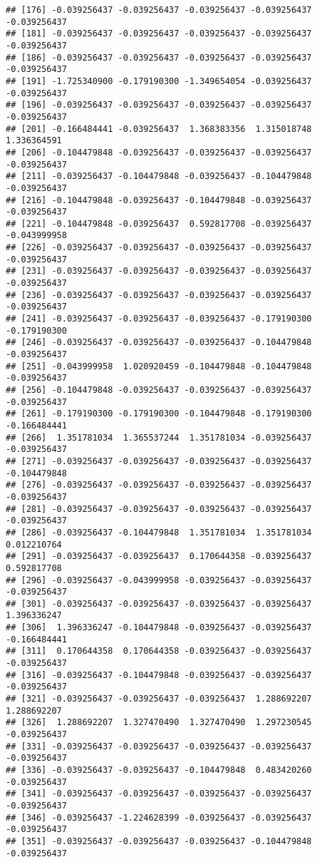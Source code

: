 \documentclass[
]{article}
\begin{document}
\begin{verbatim}
## [176] -0.039256437 -0.039256437 -0.039256437 -0.039256437 -0.039256437
## [181] -0.039256437 -0.039256437 -0.039256437 -0.039256437 -0.039256437
## [186] -0.039256437 -0.039256437 -0.039256437 -0.039256437 -0.039256437
## [191] -1.725340900 -0.179190300 -1.349654054 -0.039256437 -0.039256437
## [196] -0.039256437 -0.039256437 -0.039256437 -0.039256437 -0.039256437
## [201] -0.166484441 -0.039256437  1.368383356  1.315018748  1.336364591
## [206] -0.104479848 -0.039256437 -0.039256437 -0.039256437 -0.039256437
## [211] -0.039256437 -0.104479848 -0.039256437 -0.104479848 -0.039256437
## [216] -0.104479848 -0.039256437 -0.104479848 -0.039256437 -0.039256437
## [221] -0.104479848 -0.039256437  0.592817708 -0.039256437 -0.043999958
## [226] -0.039256437 -0.039256437 -0.039256437 -0.039256437 -0.039256437
## [231] -0.039256437 -0.039256437 -0.039256437 -0.039256437 -0.039256437
## [236] -0.039256437 -0.039256437 -0.039256437 -0.039256437 -0.039256437
## [241] -0.039256437 -0.039256437 -0.039256437 -0.179190300 -0.179190300
## [246] -0.039256437 -0.039256437 -0.039256437 -0.104479848 -0.039256437
## [251] -0.043999958  1.020920459 -0.104479848 -0.104479848 -0.039256437
## [256] -0.104479848 -0.039256437 -0.039256437 -0.039256437 -0.039256437
## [261] -0.179190300 -0.179190300 -0.104479848 -0.179190300 -0.166484441
## [266]  1.351781034  1.365537244  1.351781034 -0.039256437 -0.039256437
## [271] -0.039256437 -0.039256437 -0.039256437 -0.039256437 -0.104479848
## [276] -0.039256437 -0.039256437 -0.039256437 -0.039256437 -0.039256437
## [281] -0.039256437 -0.039256437 -0.039256437 -0.039256437 -0.039256437
## [286] -0.039256437 -0.104479848  1.351781034  1.351781034  0.012210764
## [291] -0.039256437 -0.039256437  0.170644358 -0.039256437  0.592817708
## [296] -0.039256437 -0.043999958 -0.039256437 -0.039256437 -0.039256437
## [301] -0.039256437 -0.039256437 -0.039256437 -0.039256437  1.396336247
## [306]  1.396336247 -0.104479848 -0.039256437 -0.039256437 -0.166484441
## [311]  0.170644358  0.170644358 -0.039256437 -0.039256437 -0.039256437
## [316] -0.039256437 -0.104479848 -0.039256437 -0.039256437 -0.039256437
## [321] -0.039256437 -0.039256437 -0.039256437  1.288692207  1.288692207
## [326]  1.288692207  1.327470490  1.327470490  1.297230545 -0.039256437
## [331] -0.039256437 -0.039256437 -0.039256437 -0.039256437 -0.039256437
## [336] -0.039256437 -0.039256437 -0.104479848  0.483420260 -0.039256437
## [341] -0.039256437 -0.039256437 -0.039256437 -0.039256437 -0.039256437
## [346] -0.039256437 -1.224628399 -0.039256437 -0.039256437 -0.039256437
## [351] -0.039256437 -0.039256437 -0.039256437 -0.104479848 -0.039256437

\end{verbatim}
\end{document}
